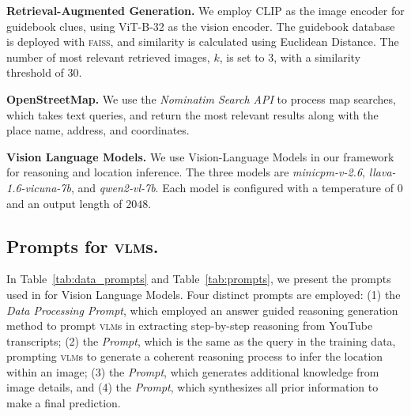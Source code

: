 \textbf{Retrieval-Augmented Generation.} We employ CLIP as the image encoder for guidebook clues, using ViT-B-32 as the vision encoder. The guidebook database is deployed with \textsc{faiss}, and similarity is calculated using Euclidean Distance. The number of most relevant retrieved images, $k$, is set to 3, with a similarity threshold of 30.

\textbf{OpenStreetMap.} We use the \textit{Nominatim Search API} to process map searches, which takes text queries, and return the most relevant results along with the place name, address, and coordinates.


\textbf{Vision Language Models.} We use Vision-Language Models in our framework for reasoning and location inference. The three models are \mbox{\textit{minicpm-v-2.6}}, \mbox{\textit{llava-1.6-vicuna-7b}}, and \mbox{\textit{qwen2-vl-7b}}. Each model is configured with a temperature of $0$ and an output length of $2048$.

\subsection{Prompts for \textsc{vlm}s.}

In Table~\ref{tab:data_prompts} and Table~\ref{tab:prompts}, we present the prompts used in \modelname for Vision Language Models. Four distinct prompts are employed: (1) the \textit{Data Processing Prompt}, which employed an answer guided reasoning generation method to prompt \textsc{vlm}s in extracting step-by-step reasoning from YouTube transcripts; (2) the \textit{\macname Prompt}, which is the same as the query in the training data, prompting \textsc{vlm}s to generate a coherent reasoning process to infer the location within an image; (3) the \textit{\micname Prompt}, which generates additional knowledge from image details, and (4) the \textit{\guessname Prompt}, which synthesizes all prior information to make a final prediction.

